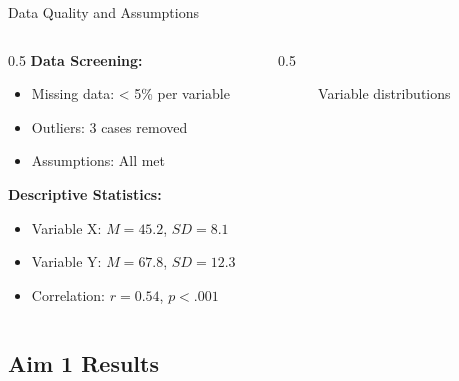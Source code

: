 \documentclass[aspectratio=169,11pt]{beamer}
\begin{document}
\begin{frame}{Data Quality and Assumptions}
  \begin{columns}[T]

    \begin{column}{0.5\textwidth}
      \textbf{Data Screening:}
      \begin{itemize}
        \item Missing data: < 5\% per variable
        \item Outliers: 3 cases removed
        \item Assumptions: All met
      \end{itemize}

      \vspace{0.3cm}

      \textbf{Descriptive Statistics:}
      \begin{itemize}
        \item Variable X: $M = 45.2$, $SD = 8.1$
        \item Variable Y: $M = 67.8$, $SD = 12.3$
        \item Correlation: $r = 0.54$, $p < .001$
      \end{itemize}
    \end{column}

    \begin{column}{0.5\textwidth}
      \begin{figure}
        \centering
        \caption{Variable distributions}
      \end{figure}
    \end{column}

  \end{columns}
\end{frame}

\subsection{Aim 1 Results}
\end{document}
